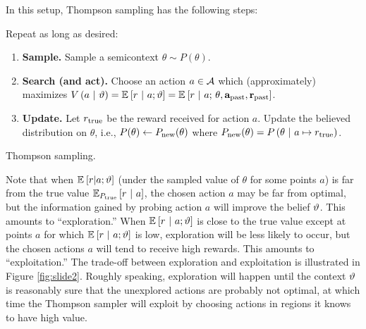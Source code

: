 In this setup, Thompson sampling has the following steps:
\begin{algorithm}[H]
  \singlespacing
  Repeat as long as desired:
  \begin{enumerate}
    \item\label{itm:thompson-step-sample} {\bf Sample.} Sample a semicontext
      $\theta \sim P(\theta)$.
    \item\label{itm:thompson-step-search} {\bf Search (and act).} Choose an
      action $a \in \Acal$ which (approximately) maximizes $V\pn{a \mvert
      \ttheta} = \Ebkt{r \mvert a; \ttheta} = \Ebkt{r \mvert a;\,\theta,
      \abf_\past, \rbf_\past}$.
    \item {\bf Update.} Let $r_\true$ be the reward received for action $a$.
      Update the believed distribution on $\theta$, i.e., $P(\theta) \gets
      P_\rmnew(\theta)$ where $P_\rmnew(\theta) = P\pn{\theta \mvert a \mapsto
      r_\true}$.
  \end{enumerate}
  \caption{Thompson sampling.}
  \label{alg:thompson}
\end{algorithm}
Note that when $\Ebkt{r|a;\ttheta}$ (under the sampled value of $\theta$ for
some points $a$) is far from the true value $\Ebkt[P_\true]{r \mvert a}$, the
chosen action $a$ may be far from optimal, but the information gained by probing
action $a$ will improve the belief $\ttheta$.  This amounts to ``exploration.''
When $\Ebkt{r \mvert a;\ttheta}$ is close to the true value except at points $a$
for which $\Ebkt{r \mvert a;\ttheta}$ is low, exploration will be less likely to
occur, but the chosen actions $a$ will tend to receive high rewards.  This
amounts to ``exploitation.'' The trade-off between exploration and exploitation
is illustrated in Figure \ref{fig:slide2}.  Roughly speaking, exploration will
happen until the context $\ttheta$ is reasonably sure that the unexplored
actions are probably not optimal, at which time the Thompson sampler will
exploit by choosing actions in regions it knows to have high value.

